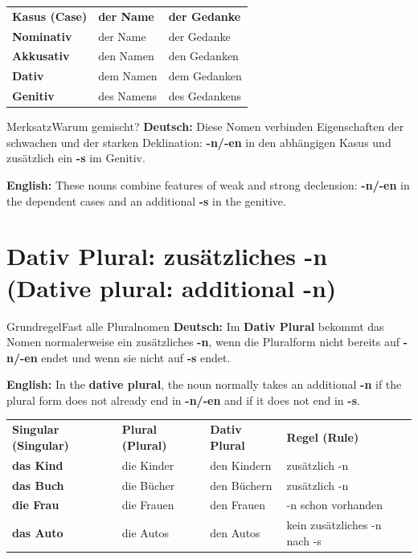 \documentclass[a4paper,11pt]{article}
\newcommand{\GermanText}[1]{\textbf{Deutsch: }#1\par}
\newcommand{\EnglishText}[1]{{\small\color{SoftGray}\textbf{English: }#1\par}}
\begin{document}
\begin{longtable}{>{\bfseries}p{3.2cm}|p{5cm}|p{5cm}}
\rowcolor{HeaderBlueDark}
\color{white}\textbf{Kasus (Case)} &
\color{white}\textbf{der Name} &
\color{white}\textbf{der Gedanke} \\
Nominativ & der Name & der Gedanke \\
Akkusativ & den Namen & den Gedanken \\
Dativ & dem Namen & dem Gedanken \\
Genitiv & des Namens & des Gedankens \\
\end{longtable}

\begin{grammarentry}{Merksatz}{Warum \glqq gemischt\grqq?}
\GermanText{Diese Nomen verbinden Eigenschaften der schwachen und der starken Deklination: \textbf{-n/-en} in den abhängigen Kasus und zusätzlich ein \textbf{-s} im Genitiv.}
\EnglishText{These nouns combine features of weak and strong declension: \textbf{-n/-en} in the dependent cases and an additional \textbf{-s} in the genitive.}
\end{grammarentry}

\section{Dativ Plural: zusätzliches -n \textnormal{(Dative plural: additional -n)}}
\begin{grammarentry}{Grundregel}{Fast alle Pluralnomen}
\GermanText{Im \textbf{Dativ Plural} bekommt das Nomen normalerweise ein zusätzliches \textbf{-n}, wenn die Pluralform nicht bereits auf \textbf{-n/-en} endet und wenn sie nicht auf \textbf{-s} endet.}
\EnglishText{In the \textbf{dative plural}, the noun normally takes an additional \textbf{-n} if the plural form does not already end in \textbf{-n/-en} and if it does not end in \textbf{-s}.}
\end{grammarentry}

\begin{longtable}{>{\bfseries}p{3.4cm}|p{3.5cm}|p{3.7cm}|p{4.2cm}}
\rowcolor{HeaderBlueDark}
\color{white}\textbf{Singular (Singular)} &
\color{white}\textbf{Plural (Plural)} &
\color{white}\textbf{Dativ Plural} &
\color{white}\textbf{Regel (Rule)} \\
das Kind & die Kinder & den Kindern & zusätzlich -n \\
das Buch & die Bücher & den Büchern & zusätzlich -n \\
die Frau & die Frauen & den Frauen & -n schon vorhanden \\
das Auto & die Autos & den Autos & kein zusätzliches -n nach -s \\
\end{longtable}
\end{document}
